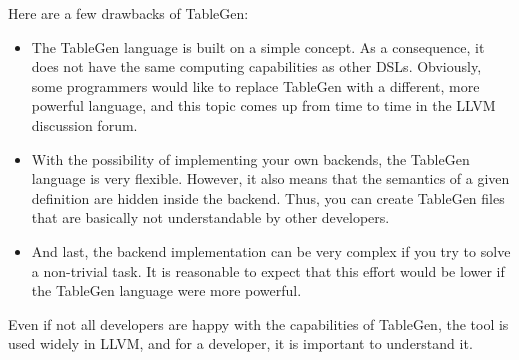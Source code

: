 
Here are a few drawbacks of TableGen:

\begin{itemize}
\item
The TableGen language is built on a simple concept. As a consequence, it does not have the same computing capabilities as other DSLs. Obviously, some programmers would like to replace TableGen with a different, more powerful language, and this topic comes up from time to time in the LLVM discussion forum.

\item
With the possibility of implementing your own backends, the TableGen language is very flexible.
However, it also means that the semantics of a given definition are hidden inside the backend. Thus, you can create TableGen files that are basically not understandable by other developers.

\item
And last, the backend implementation can be very complex if you try to solve a non-trivial task. It is reasonable to expect that this effort would be lower if the TableGen language were more powerful.
\end{itemize}

Even if not all developers are happy with the capabilities of TableGen, the tool is used widely in LLVM, and for a developer, it is important to understand it.







